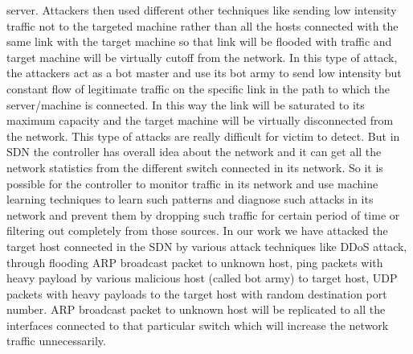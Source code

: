 \documentclass[conference]{IEEEtran}
\begin{document}
server. Attackers then used different other techniques like sending low intensity traffic not to the targeted machine rather than all the hosts connected with the same link with the target machine so that link will be flooded with traffic and target machine will be virtually cutoff from the network. In this type of attack, the attackers act as a bot master and use its bot army to send low intensity but constant flow of legitimate traffic on the specific link in the path to which the
server/machine is connected. In this way the link will be saturated to its maximum capacity and the target machine will be virtually disconnected from the network. This type of attacks are really difficult for victim to detect. But in SDN the controller has overall idea about the network and it can get all the network statistics from the different switch connected in its network. So it is possible for the controller to monitor traffic in its network and use machine learning techniques
to learn such patterns and diagnose such attacks in its network and prevent them by dropping such traffic for certain period of time or filtering out completely from those sources. In our work we have attacked the target host connected in the SDN by various attack techniques like DDoS attack, through flooding ARP broadcast packet to unknown host, ping packets with heavy payload by various malicious host (called bot army) to target host, UDP packets with heavy payloads to the target host with random destination port number. ARP broadcast packet to unknown host will be replicated to all the interfaces connected to that particular switch which will increase the network traffic unnecessarily.

\end{document}
